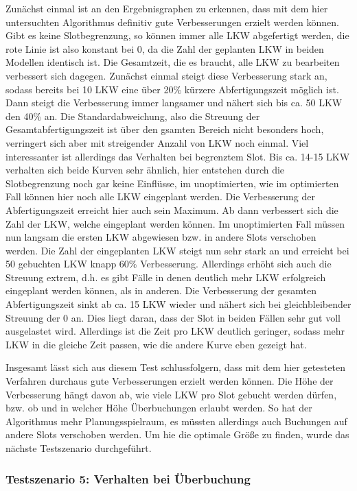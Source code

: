 Zunächst einmal ist an den Ergebnisgraphen zu erkennen, dass mit dem hier untersuchten Algorithmus definitiv gute Verbesserungen erzielt werden können. Gibt es keine Slotbegrenzung, so können immer alle LKW abgefertigt werden, die rote Linie ist also konstant bei 0, da die Zahl der geplanten LKW in beiden Modellen identisch ist. Die Gesamtzeit, die es braucht, alle LKW zu bearbeiten verbessert sich dagegen. Zunächst einmal steigt diese Verbesserung stark an, sodass bereits bei 10 LKW eine über 20\% kürzere Abfertigungszeit möglich ist. Dann steigt die Verbesserung immer langsamer und nähert sich bis ca. 50 LKW den 40\% an. Die Standardabweichung, also die Streuung der Gesamtabfertigungszeit ist über den gsamten Bereich nicht besonders hoch, verringert sich aber mit streigender Anzahl von LKW noch einmal. Viel interessanter ist allerdings das Verhalten bei begrenztem Slot. Bis ca. 14-15 LKW verhalten sich beide Kurven sehr ähnlich, hier entstehen durch die Slotbegrenzung noch gar keine Einflüsse, im unoptimierten, wie im optimierten Fall können hier noch alle LKW eingeplant werden. Die Verbesserung der Abfertigungszeit erreicht hier auch sein Maximum. Ab dann verbessert sich die Zahl der LKW, welche eingeplant werden können. Im unoptimierten Fall müssen nun langsam die ersten LKW abgewiesen bzw. in andere Slots verschoben werden. Die Zahl der eingeplanten LKW steigt nun sehr stark an und erreicht bei 50 gebuchten LKW knapp 60\% Verbesserung. Allerdings erhöht sich auch die Streuung extrem, d.h. es gibt Fälle in denen deutlich mehr LKW erfolgreich eingeplant werden können, als in anderen. Die Verbesserung der gesamten Abfertigungszeit sinkt ab ca. 15 LKW wieder und nähert sich bei gleichbleibender Streuung der 0 an. Dies liegt daran, dass der Slot in beiden Fällen sehr gut voll ausgelastet wird. Allerdings ist die Zeit pro LKW deutlich geringer, sodass mehr LKW in die gleiche Zeit passen, wie die andere Kurve eben gezeigt hat. 

Insgesamt lässt sich aus diesem Test schlussfolgern, dass mit dem hier getesteten Verfahren durchaus gute Verbesserungen erzielt werden können. Die Höhe der Verbesserung hängt davon ab, wie viele LKW pro Slot gebucht werden dürfen, bzw. ob und in welcher Höhe Überbuchungen erlaubt werden. So hat der Algorithmus mehr Planungsspielraum, es müssten allerdings auch Buchungen auf andere Slots verschoben werden. Um hie die optimale Größe zu finden, wurde das nächste Testszenario durchgeführt.

\subsubsection{Testszenario 5: Verhalten bei Überbuchung}

